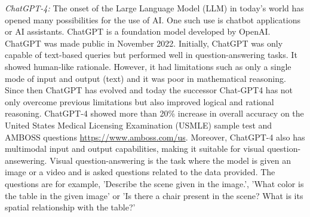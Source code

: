 \textit{ChatGPT-4:}
The onset of the Large Language Model (LLM) in today's world has opened many possibilities for the use of AI. One such use is chatbot applications or AI
assistants. ChatGPT is a foundation model developed by OpenAI. ChatGPT was made public in November 2022. Initially, ChatGPT was only capable of 
text-based queries but performed well in question-answering tasks. It showed human-like rationale. However, it had limitations such as 
only a single mode of input and output (text) and it was poor in mathematical reasoning. Since then ChatGPT has evolved and today the successor 
Chat-GPT4 has not only overcome previous limitations but also improved logical and rational reasoning. ChatGPT-4 showed more than 20\% increase in overall accuracy
on the  United States Medical Licensing Examination (USMLE) sample test and AMBOSS questions \url{https://www.amboss.com/us}. Moreover, ChatGPT-4 
also has multimodal input and output capabilities, making it suitable for visual question-ansewering. Visual question-answering is the task where
the model is given an image or a video and is asked questions related to the data provided. The questions are for example, 'Describe the scene given in 
the image.', 'What color is the table in the given image' or 'Is there a chair present in the scene? What is its spatial relationship with the table?'

